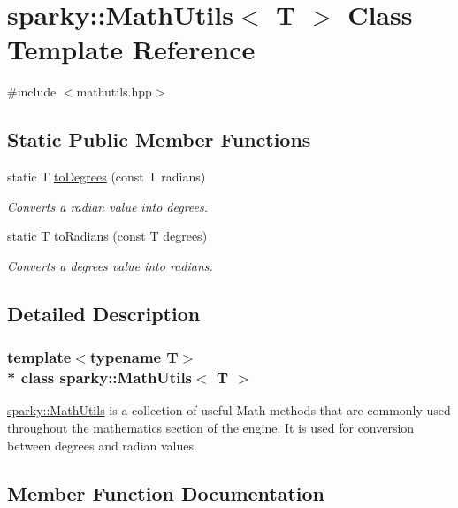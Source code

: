 \hypertarget{classsparky_1_1_math_utils}{}\section{sparky\+:\+:Math\+Utils$<$ T $>$ Class Template Reference}
\label{classsparky_1_1_math_utils}


{\ttfamily \#include $<$mathutils.\+hpp$>$}

\subsection*{Static Public Member Functions}
\begin{DoxyCompactItemize}
\item 
static T \hyperlink{classsparky_1_1_math_utils_a98666e5a1ff12c3053c66c67ae878201}{to\+Degrees} (const T radians)
\begin{DoxyCompactList}\small\item\em Converts a radian value into degrees. \end{DoxyCompactList}\item 
static T \hyperlink{classsparky_1_1_math_utils_af2957a4e746767a9d3502d49224c7549}{to\+Radians} (const T degrees)
\begin{DoxyCompactList}\small\item\em Converts a degrees value into radians. \end{DoxyCompactList}\end{DoxyCompactItemize}


\subsection{Detailed Description}
\subsubsection*{template$<$typename T$>$\\*
class sparky\+::\+Math\+Utils$<$ T $>$}

\hyperlink{classsparky_1_1_math_utils}{sparky\+::\+Math\+Utils} is a collection of useful Math methods that are commonly used throughout the mathematics section of the engine. It is used for conversion between degrees and radian values. 

\subsection{Member Function Documentation}
